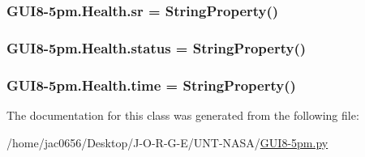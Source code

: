 \subsubsection[{\texorpdfstring{sr}{sr}}]{\setlength{\rightskip}{0pt plus 5cm}G\+U\+I8-\/5pm.\+Health.\+sr = String\+Property()\hspace{0.3cm}{\ttfamily [static]}}\hypertarget{classGUI8-5pm_1_1Health_a9078619f648e81b2741764d28e22e848}{}\label{classGUI8-5pm_1_1Health_a9078619f648e81b2741764d28e22e848}
\subsubsection[{\texorpdfstring{status}{status}}]{\setlength{\rightskip}{0pt plus 5cm}G\+U\+I8-\/5pm.\+Health.\+status = String\+Property()\hspace{0.3cm}{\ttfamily [static]}}\hypertarget{classGUI8-5pm_1_1Health_a84aa8f95f5e3d9e5cfcccc6a27e6d4e2}{}\label{classGUI8-5pm_1_1Health_a84aa8f95f5e3d9e5cfcccc6a27e6d4e2}
\subsubsection[{\texorpdfstring{time}{time}}]{\setlength{\rightskip}{0pt plus 5cm}G\+U\+I8-\/5pm.\+Health.\+time = String\+Property()\hspace{0.3cm}{\ttfamily [static]}}\hypertarget{classGUI8-5pm_1_1Health_aab9c45abe8afaa3d8193cde79882997b}{}\label{classGUI8-5pm_1_1Health_aab9c45abe8afaa3d8193cde79882997b}


The documentation for this class was generated from the following file\+:\begin{DoxyCompactItemize}
\item 
/home/jac0656/\+Desktop/\+J-\/\+O-\/\+R-\/\+G-\/\+E/\+U\+N\+T-\/\+N\+A\+S\+A/\hyperlink{GUI8-5pm_8py}{G\+U\+I8-\/5pm.\+py}\end{DoxyCompactItemize}
